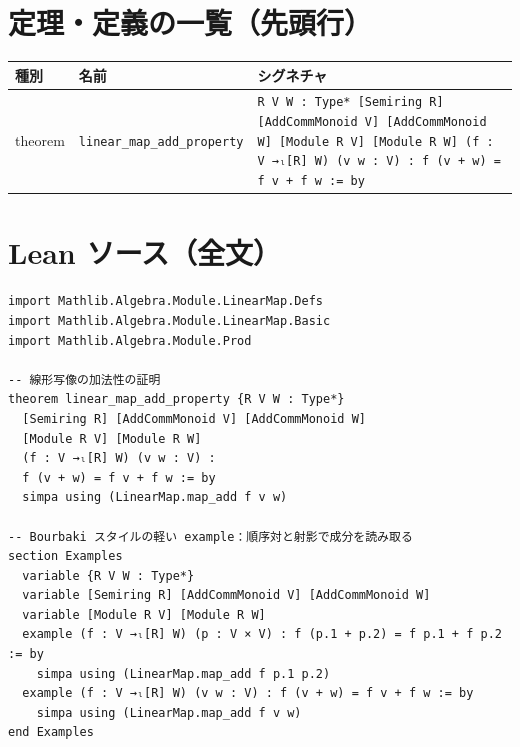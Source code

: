 \documentclass[12pt]{article}
\theoremstyle{definition}
\begin{document}
\section*{定理・定義の一覧（先頭行）}
\begin{center}
\begin{tabular}{lll}
\textbf{種別} & \textbf{名前} & \textbf{シグネチャ} \\ \hline
theorem & \texttt{linear\_map\_add\_property} & \texttt{{R V W : Type*} [Semiring R] [AddCommMonoid V] [AddCommMonoid W] [Module R V] [Module R W] (f : V →ₗ[R] W) (v w : V) : f (v + w) = f v + f w := by} \\
\end{tabular}
\end{center}

\section*{Lean ソース（全文）}
\begin{lstlisting}
import Mathlib.Algebra.Module.LinearMap.Defs
import Mathlib.Algebra.Module.LinearMap.Basic
import Mathlib.Algebra.Module.Prod

-- 線形写像の加法性の証明
theorem linear_map_add_property {R V W : Type*} 
  [Semiring R] [AddCommMonoid V] [AddCommMonoid W] 
  [Module R V] [Module R W]
  (f : V →ₗ[R] W) (v w : V) : 
  f (v + w) = f v + f w := by
  simpa using (LinearMap.map_add f v w)

-- Bourbaki スタイルの軽い example：順序対と射影で成分を読み取る
section Examples
  variable {R V W : Type*}
  variable [Semiring R] [AddCommMonoid V] [AddCommMonoid W]
  variable [Module R V] [Module R W]
  example (f : V →ₗ[R] W) (p : V × V) : f (p.1 + p.2) = f p.1 + f p.2 := by
    simpa using (LinearMap.map_add f p.1 p.2)
  example (f : V →ₗ[R] W) (v w : V) : f (v + w) = f v + f w := by
    simpa using (LinearMap.map_add f v w)
end Examples

\end{lstlisting}
\end{document}
